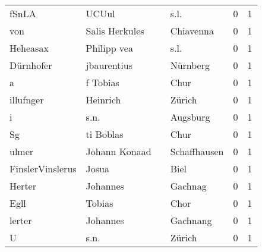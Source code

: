 \begin{center}
\begin{tiny}
\begin{longtabu}{llllrr}
                    fSnLA &                              UCUul &             &                                        s.l. &          0 &         1 \\
                      von &                     Salis Herkules &             &                                   Chiavenna &          0 &         1 \\
                 Heheasax &                        Philipp vea &             &                                        s.l. &          0 &         1 \\
                Dürnhofer &                        jbaurentius &             &                                    Nürnberg &          0 &         1 \\
                        a &                           f Tobias &             &                                        Chur &          0 &         1 \\
                illufnger &                           Heinrich &             &                                      Zürich &          0 &         1 \\
                        i &                               s.n. &             &                                    Augsburg &          0 &         1 \\
                       Sg &                          ti Boblas &             &                                        Chur &          0 &         1 \\
                    ulmer &                      Johann Konaad &             &                                Schaffhausen &          0 &         1 \\
         FinslerVinslerus &                              Josua &             &                                        Biel &          0 &         1 \\
                   Herter &                           Johannes &             &                                     Gachnag &          0 &         1 \\
                     Egll &                             Tobias &             &                                        Chor &          0 &         1 \\
                   lerter &                           Johannes &             &                                    Gachnang &          0 &         1 \\
                        U &                               s.n. &             &                                      Zürich &          0 &         1 \\

\end{longtabu}
\end{tiny}
\end{center}
